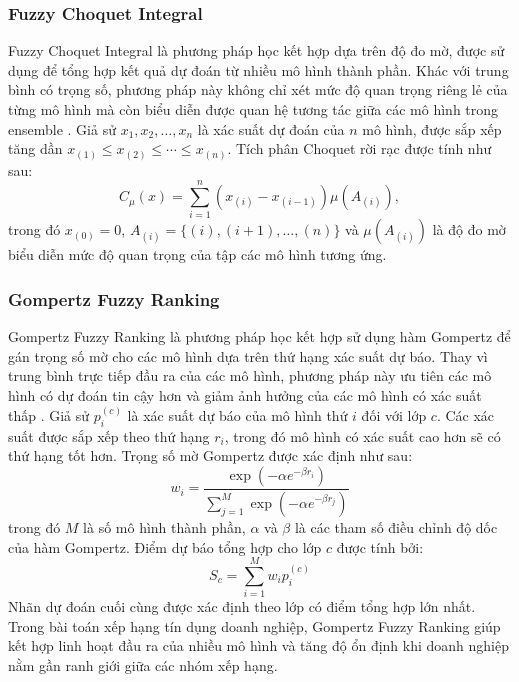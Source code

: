 \documentclass[10pt,twoside]{article}
\begin{document}
\subsubsection{Fuzzy Choquet Integral} Fuzzy Choquet Integral là phương pháp học kết hợp dựa trên độ đo mờ, được sử dụng để tổng hợp kết quả dự đoán từ nhiều mô hình thành phần. Khác với trung bình có trọng số, phương pháp này không chỉ xét mức độ quan trọng riêng lẻ của từng mô hình mà còn biểu diễn được quan hệ tương tác giữa các mô hình trong ensemble \cite{zadeh_fuzzy_1965, choquet_theory_1954}. Giả sử $x_1, x_2, \ldots, x_n$ là xác suất dự đoán của $n$ mô hình, được sắp xếp tăng dần $x_{(1)} \leq x_{(2)} \leq \cdots \leq x_{(n)}$. Tích phân Choquet rời rạc được tính như sau: \begin{equation} C_{\mu}(x) = \sum_{i=1}^{n} \left(x_{(i)} - x_{(i-1)}\right)\mu(A_{(i)}), \end{equation} trong đó $x_{(0)}=0$, $A_{(i)}=\{(i),(i+1),\ldots,(n)\}$ và $\mu(A_{(i)})$ là độ đo mờ biểu diễn mức độ quan trọng của tập các mô hình tương ứng.

\subsubsection{Gompertz Fuzzy Ranking} 
Gompertz Fuzzy Ranking là phương pháp học kết hợp sử dụng hàm Gompertz để gán trọng số mờ cho các mô hình dựa trên thứ hạng xác suất dự báo. Thay vì trung bình trực tiếp đầu ra của các mô hình, phương pháp này ưu tiên các mô hình có dự đoán tin cậy hơn và giảm ảnh hưởng của các mô hình có xác suất thấp \cite{kundu_fuzzy_2021}. Giả sử $p_i^{(c)}$ là xác suất dự báo của mô hình thứ $i$ đối với lớp $c$. Các xác suất được sắp xếp theo thứ hạng $r_i$, trong đó mô hình có xác suất cao hơn sẽ có thứ hạng tốt hơn. Trọng số mờ Gompertz được xác định như sau: 
\begin{equation} 
w_i = \frac{\exp \left(-\alpha e^{-\beta r_i}\right)} {\sum_{j=1}^{M} \exp \left(-\alpha e^{-\beta r_j}\right)} 
\end{equation} 
trong đó $M$ là số mô hình thành phần, $\alpha$ và $\beta$ là các tham số điều chỉnh độ dốc của hàm Gompertz. Điểm dự báo tổng hợp cho lớp $c$ được tính bởi: 
\begin{equation} 
S_c = \sum_{i=1}^{M} w_i p_i^{(c)} 
\end{equation} 
Nhãn dự đoán cuối cùng được xác định theo lớp có điểm tổng hợp lớn nhất. Trong bài toán xếp hạng tín dụng doanh nghiệp, Gompertz Fuzzy Ranking giúp kết hợp linh hoạt đầu ra của nhiều mô hình và tăng độ ổn định khi doanh nghiệp nằm gần ranh giới giữa các nhóm xếp hạng.
\end{document}
